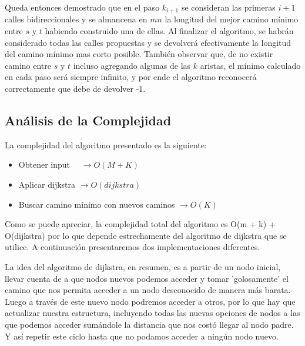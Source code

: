 \vspace{1em}

Queda entonces demostrado que en el paso $k_{i+1}$ se consideran las primeras $i+1$ calles bidireccionales y se almancena en $mn$ la longitud del mejor camino mínimo entre $s$ y $t$ habiendo construido una de ellas. Al finalizar el algoritmo, se habrán considerado todas las calles propuestas y se devolverá efectivamente la longitud del camino mínimo mas corto posible. También observar que, de no existir camino entre $s$ y $t$ incluso agregando algunas de las $k$ aristas, el mínimo calculado en cada paso será siempre infinito, y por ende el algoritmo reconocerá correctamente que debe de devolver -1.

\subsection{Análisis de la Complejidad}
\vspace{1em}

La complejidad del algoritmo presentado es la siguiente: 

\begin{itemize}
    \item Obtener input \qquad \qquad \qquad \qquad \qquad \quad \quad \ \ $\rightarrow O(M + K)$
    \item Aplicar dijkstra \qquad \qquad \qquad \qquad \qquad \qquad $\rightarrow O(dijkstra)$
    \item Buscar camino mínimo con nuevos caminos $\rightarrow O(K)$
\end{itemize}

Como se puede apreciar, la complejidad total del algoritmo es O(m + k) + O(dijkstra) por lo que depende estrechamente del algoritmo de dijkstra que se utilice. A continuación presentaremos dos implementaciones diferentes.

\vspace{1em}

La idea del algoritmo de dijkstra, en resumen, es a partir de un nodo inicial, llevar cuenta de a que nodos nuevos podemos acceder y tomar 'golosamente' el camino que nos permita acceder a un nodo desconocido de manera más barata. Luego a través de este nuevo nodo podremos acceder a otros, por lo que hay que actualizar nuestra estructura, incluyendo todas las nuevas opciones de nodos a las que podemos acceder sumándole la distancia que nos costó llegar al nodo padre. Y así repetir este ciclo hasta que no podamos acceder a ningún nodo nuevo. 

